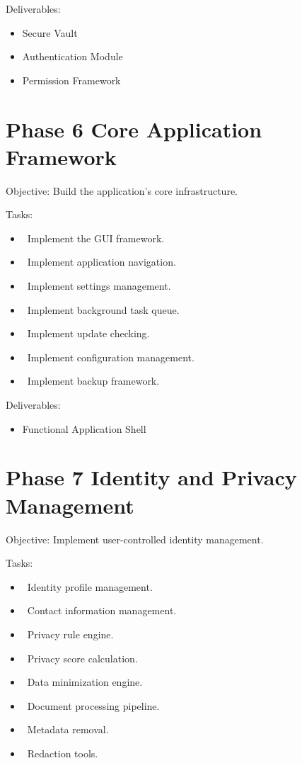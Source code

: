 Deliverables:
\begin{itemize}
	\item Secure Vault
	\item Authentication Module
	\item Permission Framework
\end{itemize}
\section{Phase 6 Core Application Framework}
Objective: Build the application's core infrastructure.

Tasks:
\begin{itemize}
	\item[] \checkbox\ Implement the GUI framework.
	\item[] \checkbox\ Implement application navigation.
	\item[] \checkbox\ Implement settings management.
	\item[] \checkbox\ Implement background task queue.
	\item[] \checkbox\ Implement update checking.
	\item[] \checkbox\ Implement configuration management.
	\item[] \checkbox\ Implement backup framework.
\end{itemize}

Deliverables:
\begin{itemize}
	\item Functional Application Shell
\end{itemize}
\section{Phase 7 Identity and Privacy Management}
Objective: Implement user-controlled identity management.

Tasks:
\begin{itemize}
	\item[] \checkbox\ Identity profile management.
	\item[] \checkbox\ Contact information management.
	\item[] \checkbox\ Privacy rule engine.
	\item[] \checkbox\ Privacy score calculation.
	\item[] \checkbox\ Data minimization engine.
	\item[] \checkbox\ Document processing pipeline.
	\item[] \checkbox\ Metadata removal.
	\item[] \checkbox\ Redaction tools.
\end{itemize}

